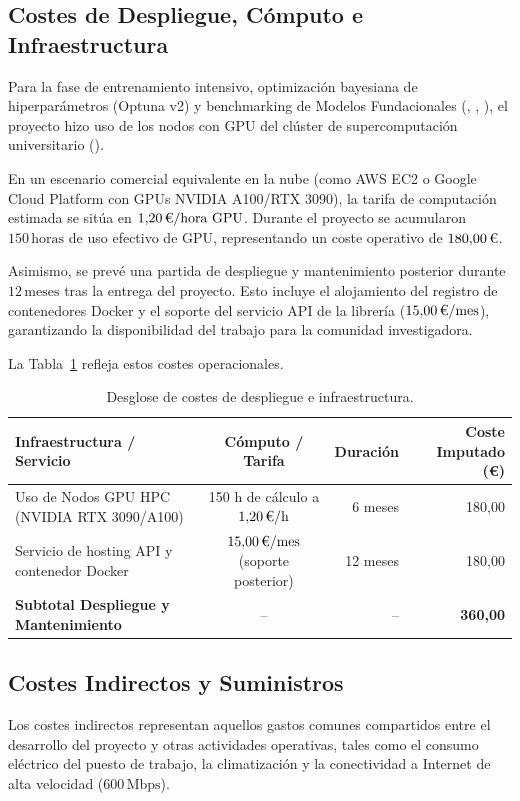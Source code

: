 \subsection{Costes de Despliegue, Cómputo e Infraestructura}
Para la fase de entrenamiento intensivo, optimización bayesiana de hiperparámetros (Optuna v2) y benchmarking de Modelos Fundacionales (\moment{}, \chronos{}, \timesfm{}), el proyecto hizo uso de los nodos con GPU del clúster de supercomputación universitario (). 

En un escenario comercial equivalente en la nube (como AWS EC2 o Google Cloud Platform con GPUs NVIDIA A100/RTX 3090), la tarifa de computación estimada se sitúa en $1{,}20\,\text{\euro}/\text{hora GPU}$. Durante el proyecto se acumularon $150\,\text{horas}$ de uso efectivo de GPU, representando un coste operativo de $180{,}00\,\text{\euro}$.

Asimismo, se prevé una partida de despliegue y mantenimiento posterior durante $12\,\text{meses}$ tras la entrega del proyecto. Esto incluye el alojamiento del registro de contenedores Docker y el soporte del servicio API de la librería  ($15{,}00\,\text{\euro}/\text{mes}$), garantizando la disponibilidad del trabajo para la comunidad investigadora.

La Tabla~\ref{tab:costes_despliegue} refleja estos costes operacionales.

\begin{table}[htbp]
\centering
\caption{Desglose de costes de despliegue e infraestructura.}
\label{tab:costes_despliegue}
\small
\begin{tabularx}{\linewidth}{@{}Xcrr@{}}
\toprule
\textbf{Infraestructura / Servicio} & \textbf{Cómputo / Tarifa} & \textbf{Duración} & \textbf{Coste Imputado (\euro)} \\
\midrule
Uso de Nodos GPU HPC (NVIDIA RTX 3090/A100) & 150 h de cálculo a $1{,}20\,\text{\euro}/\text{h}$ & 6 meses & 180,00 \\
Servicio de hosting API y contenedor Docker & $15{,}00\,\text{\euro}/\text{mes}$ (soporte posterior) & 12 meses & 180,00 \\
\midrule
\textbf{Subtotal Despliegue y Mantenimiento} & -- & -- & \textbf{360,00} \\
\bottomrule
\end{tabularx}
\end{table}

\subsection{Costes Indirectos y Suministros}
Los costes indirectos representan aquellos gastos comunes compartidos entre el desarrollo del proyecto y otras actividades operativas, tales como el consumo eléctrico del puesto de trabajo, la climatización y la conectividad a Internet de alta velocidad ($600\,\text{Mbps}$).

